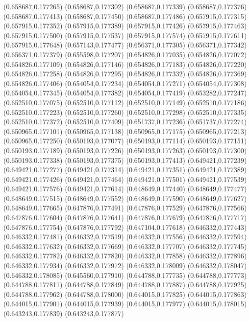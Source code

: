 (0.658687,0.177265)
(0.658687,0.177302)
(0.658687,0.177339)
(0.658687,0.177376)
(0.658687,0.177413)
(0.658687,0.177450)
(0.658687,0.177486)
(0.657915,0.177315)
(0.657915,0.177352)
(0.657915,0.177389)
(0.657915,0.177426)
(0.657915,0.177463)
(0.657915,0.177500)
(0.657915,0.177537)
(0.657915,0.177574)
(0.657915,0.177611)
(0.657915,0.177648)
(0.657143,0.177477)
(0.656371,0.177305)
(0.656371,0.177342)
(0.656371,0.177379)
(0.655598,0.177207)
(0.654826,0.177035)
(0.654826,0.177072)
(0.654826,0.177109)
(0.654826,0.177146)
(0.654826,0.177183)
(0.654826,0.177220)
(0.654826,0.177258)
(0.654826,0.177295)
(0.654826,0.177332)
(0.654826,0.177369)
(0.654826,0.177406)
(0.654054,0.177234)
(0.654054,0.177271)
(0.654054,0.177308)
(0.654054,0.177345)
(0.654054,0.177382)
(0.654054,0.177419)
(0.653282,0.177247)
(0.652510,0.177075)
(0.652510,0.177112)
(0.652510,0.177149)
(0.652510,0.177186)
(0.652510,0.177223)
(0.652510,0.177260)
(0.652510,0.177298)
(0.652510,0.177335)
(0.652510,0.177372)
(0.652510,0.177409)
(0.651737,0.177236)
(0.651737,0.177274)
(0.650965,0.177101)
(0.650965,0.177138)
(0.650965,0.177175)
(0.650965,0.177213)
(0.650965,0.177250)
(0.650193,0.177077)
(0.650193,0.177114)
(0.650193,0.177151)
(0.650193,0.177189)
(0.650193,0.177226)
(0.650193,0.177263)
(0.650193,0.177300)
(0.650193,0.177338)
(0.650193,0.177375)
(0.650193,0.177413)
(0.649421,0.177239)
(0.649421,0.177277)
(0.649421,0.177314)
(0.649421,0.177351)
(0.649421,0.177389)
(0.649421,0.177426)
(0.649421,0.177464)
(0.649421,0.177501)
(0.649421,0.177539)
(0.649421,0.177576)
(0.649421,0.177614)
(0.648649,0.177440)
(0.648649,0.177477)
(0.648649,0.177515)
(0.648649,0.177552)
(0.648649,0.177590)
(0.648649,0.177627)
(0.648649,0.177665)
(0.647876,0.177491)
(0.647876,0.177529)
(0.647876,0.177566)
(0.647876,0.177604)
(0.647876,0.177641)
(0.647876,0.177679)
(0.647876,0.177717)
(0.647876,0.177754)
(0.647876,0.177792)
(0.647104,0.177618)
(0.646332,0.177443)
(0.646332,0.177481)
(0.646332,0.177519)
(0.646332,0.177556)
(0.646332,0.177594)
(0.646332,0.177632)
(0.646332,0.177669)
(0.646332,0.177707)
(0.646332,0.177745)
(0.646332,0.177782)
(0.646332,0.177820)
(0.646332,0.177858)
(0.646332,0.177896)
(0.646332,0.177934)
(0.646332,0.177972)
(0.646332,0.178009)
(0.646332,0.178047)
(0.646332,0.178085)
(0.645560,0.177910)
(0.644788,0.177735)
(0.644788,0.177773)
(0.644788,0.177811)
(0.644788,0.177849)
(0.644788,0.177887)
(0.644788,0.177925)
(0.644788,0.177962)
(0.644788,0.178000)
(0.644015,0.177825)
(0.644015,0.177863)
(0.644015,0.177901)
(0.644015,0.177939)
(0.644015,0.177977)
(0.644015,0.178015)
(0.643243,0.177839)
(0.643243,0.177877)
